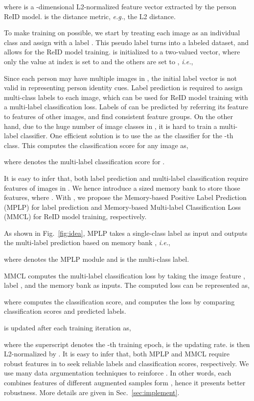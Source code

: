 \documentclass[10pt,twocolumn,letterpaper]{article}
\begin{document}
where  is a -dimensional L2-normalized feature vector extracted by the person ReID model.  is the distance metric, \emph{e.g.}, the L2 distance.

To make training on  possible, we start by treating each image as an individual class and assign  with a label . This pseudo label turns  into a labeled dataset, and allows for the ReID model training.  is initialized to a two-valued vector, where only the value at index  is set to  and the others are set to , \emph{i.e.},



Since each person may have multiple images in , the initial label vector is not valid in representing person identity cues. Label prediction is required to assign multi-class labels to each image, which can be used for ReID model training with a multi-label classification loss. Labels of  can be predicted by referring its feature  to features of other images, and find consistent feature groups. On the other hand, due to the huge number of image classes in , it is hard to train a multi-label classifier. One efficient solution is to use the  as the classifier for the -th class. This computes the classification score for any image  as,

where  denotes the multi-label classification score for .

It is easy to infer that, both label prediction and multi-label classification require features of images in . We hence introduce a  sized memory bank  to store those features, where . With , we propose the Memory-based Positive Label Prediction
(MPLP) for label prediction and Memory-based Multi-label Classification Loss (MMCL) for ReID model training, respectively.

As shown in Fig.~\ref{fig:idea}, MPLP takes a single-class label as input and outputs the multi-label prediction  based on memory bank , \emph{i.e.},

where  denotes the MPLP module and  is the multi-class label.


MMCL computes the multi-label classification loss by taking the image feature , label , and the memory bank  as inputs. The computed loss  can be represented as,

where  computes the classification score, and  computes the loss by comparing classification scores and predicted labels.

 is updated after each training iteration as,

where the superscript  denotes the -th training epoch,  is the updating rate.  is then L2-normalized by . It is easy to infer that, both MPLP and MMCL require robust features in  to seek reliable labels and classification scores, respectively. We use many data argumentation techniques to reinforce . In other words, each  combines features of different augmented samples form , hence it presents better robustness. More details are given in Sec.~\ref{sec:implement}.
\end{document}
